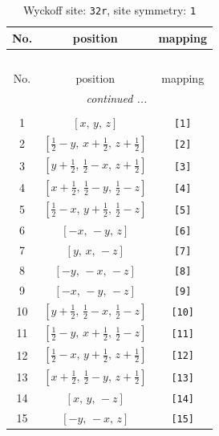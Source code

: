 \documentclass[fleqn,8pt]{jsarticle}
\begin{document}
\renewcommand{\arraystretch}{1.2}
\begin{longtable}{ccc}
\caption{Wyckoff site: {\tt 32r}, site symmetry: {\tt 1}}
 \\
 \hline \hline
No. & position & mapping \\ \hline \endfirsthead

\multicolumn{2}{l}{\tablename\ \thetable{}} \\
 \hline \hline
No. & position & mapping \\ \hline \endhead

 \hline \hline
\multicolumn{2}{r}{\footnotesize\it continued ...} \\ \endfoot

 \hline \hline
\multicolumn{2}{r}{} \\ \endlastfoot

1 & $\left[ x,\, y,\, z \right]$ & {\tt [1]} \\ \hline
2 & $\left[ \frac{1}{2} - y,\, x + \frac{1}{2},\, z + \frac{1}{2} \right]$ & {\tt [2]} \\ \hline
3 & $\left[ y + \frac{1}{2},\, \frac{1}{2} - x,\, z + \frac{1}{2} \right]$ & {\tt [3]} \\ \hline
4 & $\left[ x + \frac{1}{2},\, \frac{1}{2} - y,\, \frac{1}{2} - z \right]$ & {\tt [4]} \\ \hline
5 & $\left[ \frac{1}{2} - x,\, y + \frac{1}{2},\, \frac{1}{2} - z \right]$ & {\tt [5]} \\ \hline
6 & $\left[ - x,\, - y,\, z \right]$ & {\tt [6]} \\ \hline
7 & $\left[ y,\, x,\, - z \right]$ & {\tt [7]} \\ \hline
8 & $\left[ - y,\, - x,\, - z \right]$ & {\tt [8]} \\ \hline
9 & $\left[ - x,\, - y,\, - z \right]$ & {\tt [9]} \\ \hline
10 & $\left[ y + \frac{1}{2},\, \frac{1}{2} - x,\, \frac{1}{2} - z \right]$ & {\tt [10]} \\ \hline
11 & $\left[ \frac{1}{2} - y,\, x + \frac{1}{2},\, \frac{1}{2} - z \right]$ & {\tt [11]} \\ \hline
12 & $\left[ \frac{1}{2} - x,\, y + \frac{1}{2},\, z + \frac{1}{2} \right]$ & {\tt [12]} \\ \hline
13 & $\left[ x + \frac{1}{2},\, \frac{1}{2} - y,\, z + \frac{1}{2} \right]$ & {\tt [13]} \\ \hline
14 & $\left[ x,\, y,\, - z \right]$ & {\tt [14]} \\ \hline
15 & $\left[ - y,\, - x,\, z \right]$ & {\tt [15]} \\ \hline

\end{longtable}
\end{document}
